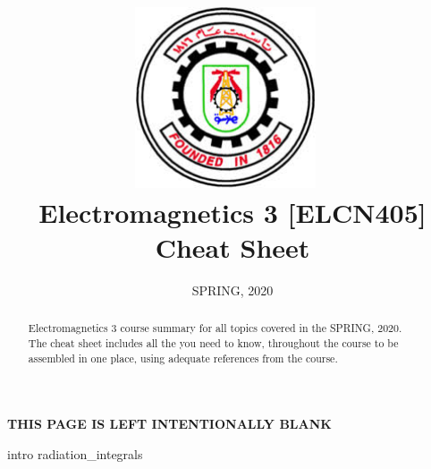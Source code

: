 \documentclass[class=article, crop=false]{standalone}
\title{
    \includegraphics[width=0.4\textwidth]{CUFELOGO.jpeg}~\\[1cm]
    Electromagnetics 3 [ELCN405] Cheat Sheet
}
\date{SPRING, 2020}
\begin{document}
    \clearpage
    \maketitle
    \thispagestyle{empty}
    \newpage
    \setcounter{page}{1}
    \begin{abstract}
    Electromagnetics 3 course\cite{ELCN405} summary for all topics covered in the SPRING, 2020. \\
    The cheat sheet includes all the you need to know, throughout the course to be assembled in one place, using
    adequate references from the course\cite{ELCN405}.

    \end{abstract}
    \newpage
    \tableofcontents
    \newpage
    \listoffigures
    \newpage
    \listoftables
    \newpage


    \thispagestyle{empty}
    \vspace*{\fill}
    \begin{center}
        \textbf{
            \uppercase{this page is left intentionally blank}
        }
    \end{center}
    \vspace*{\fill}

    \newpage
    \setcounter{page}{1}

    {intro}
    \newpage
    {radiation_integrals}

    \newpage
    \setcounter{page}{1}
    
    
\end{document}

